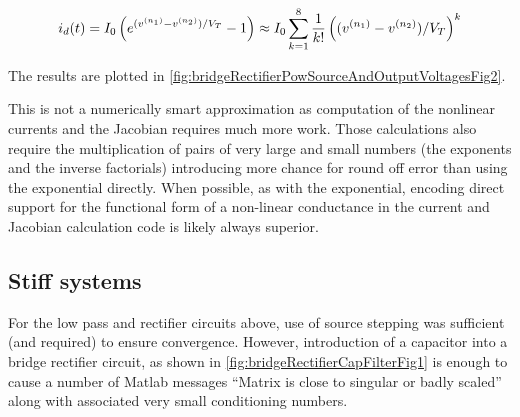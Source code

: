 \begin{dmath}\label{eqn:ece1254projectReport:1480}
i_d(t) = I_0 \lr{ e^{(v^{(n_1)} - v^{(n_2)})/V_T} - 1}
\approx
I_0 \sum_{k=1}^8
\inv{k!} \lr{(v^{(n_1)} - v^{(n_2)})/V_T}^k
\end{dmath}

The results are plotted in \cref{fig:bridgeRectifierPowSourceAndOutputVoltagesFig2}.


This is not a numerically smart approximation as computation of the nonlinear currents and the Jacobian requires much more work.
Those calculations also require the multiplication of pairs of very large and small numbers (the exponents and the inverse factorials) introducing more chance for round off error than using the exponential directly.
When possible, as with the exponential, encoding direct support for the functional form of a non-linear conductance in the current and Jacobian calculation code is likely always superior.

\subsection{Stiff systems}

For the low pass and rectifier circuits above, use of source stepping was sufficient (and required) to ensure convergence.
However, introduction of a capacitor into a bridge rectifier circuit, as shown in \cref{fig:bridgeRectifierCapFilterFig1} is enough to cause a number of Matlab messages ``Matrix is close to singular or badly scaled'' along with associated very small conditioning numbers.



